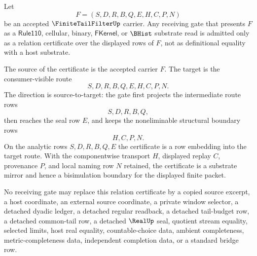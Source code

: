 \begin{theorem}
\label{thm:finite-tail-filter-substrate-bisimulation-boundary}
Let
$$
F=(S,D,R,B,Q,E,H,C,P,N)
$$
be an accepted $\FiniteTailFilterUp$ carrier. Any receiving gate that presents $F$ as a $\mathsf{Rule110}$, cellular, binary, $\mathsf{FKernel}$, or $\BHist$ substrate read is admitted only as a relation certificate over the displayed rows of $F$, not as definitional equality with a host substrate.

The source of the certificate is the accepted carrier $F$. The target is the consumer-visible route
$$
S,D,R,B,Q,E,H,C,P,N.
$$
The direction is source-to-target: the gate first projects the intermediate route rows
$$
S,D,R,B,Q,
$$
then reaches the seal row $E$, and keeps the noneliminable structural boundary rows
$$
H,C,P,N.
$$
On the analytic rows $S,D,R,B,Q,E$ the certificate is a row embedding into the target route. With the componentwise transport $H$, displayed replay $C$, provenance $P$, and local naming row $N$ retained, the certificate is a substrate mirror and hence a bisimulation boundary for the displayed finite packet.

No receiving gate may replace this relation certificate by a copied source excerpt, a host coordinate, an external source coordinate, a private window selector, a detached dyadic ledger, a detached regular readback, a detached tail-budget row, a detached common-tail row, a detached $\RealUp$ seal, quotient stream equality, selected limits, host real equality, countable-choice data, ambient completeness, metric-completeness data, independent completion data, or a standard bridge row.
\end{theorem}
